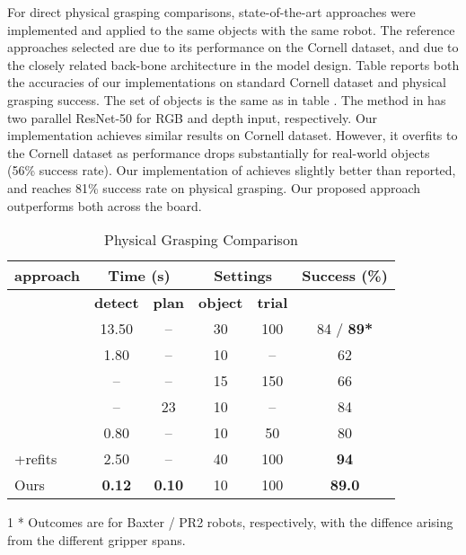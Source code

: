 \documentclass[letterpaper, 10 pt, journal, twoside]{IEEEtran}
\begin{document}
For direct physical grasping comparisons, state-of-the-art 
approaches were 
implemented and applied to the same objects with the same robot. The
reference approaches selected are \cite{GuEtAl_ICRA2017} due to its
performance on the Cornell dataset, and \cite{kumra2016robotic} due to the
closely related back-bone architecture in the model design.
Table  reports both the accuracies of our 
implementations on standard Cornell dataset and physical grasping success.
The set of objects is the same as in table . 
The method in \cite{kumra2016robotic} has two parallel ResNet-50 for RGB and 
depth input, respectively.  Our implementation achieves similar results on
Cornell dataset. However, it overfits to the Cornell dataset as performance
drops substantially for real-world objects (56\% success rate).  Our
implementation of \cite{GuEtAl_ICRA2017} achieves slightly better than
reported, and reaches 81\% success rate on physical grasping. Our proposed
approach outperforms both across the board.


\begin {table}[t]
  \centering
  \caption {Physical Grasping Comparison  }
  \small
  \begin{tabular}{ | l | c | c | c | c | c |}
    \hline
{\bf approach} & \multicolumn{2}{c|}{ \bf{Time} (s)} & \multicolumn{2}{c|}{ \bf{Settings}}   & \bf{Success (\%)}\\ \hline
                                  & \bf{detect} & \bf{plan}  & \bf{object} & \bf{trial} & \\ \hline
    
    \cite{lenz2015deep}        &  13.50&  --    &  30   & 100   &  84 / \bf{89}* \\ \hline
    \cite{watson2017real}      &  1.80 &  --    &  10   & --    &  62     \\ \hline
    \cite{pinto2016supersizing}&  --   &  --    &  15   & 150   &  66     \\ \hline
    \cite{lu2017planning}      &  --   &23&  10   & --    &  84     \\ \hline
    \cite{MaEtAl_RSS[2017]}    &  0.80 &  --    &  10   & 50    &  80     \\ \hline
    \cite{MaEtAl_RSS[2017]}+refits&  2.50 &  -- &  40   & 100   &  \bf{94} \\ \hline \hline
    Ours                       &\bf{0.12}&\bf{0.10}& 10   & 100   &  \bf{89.0}\\

    \hline
  \end{tabular}
        \begin{tablenotes}
        \footnotesize
        \item[1] * Outcomes are for Baxter / PR2 robots, respectively, with the
        diffence arising from the different gripper spans.
\end{tablenotes}
  \vspace*{-0.05in}
\end {table}
\end{document}
